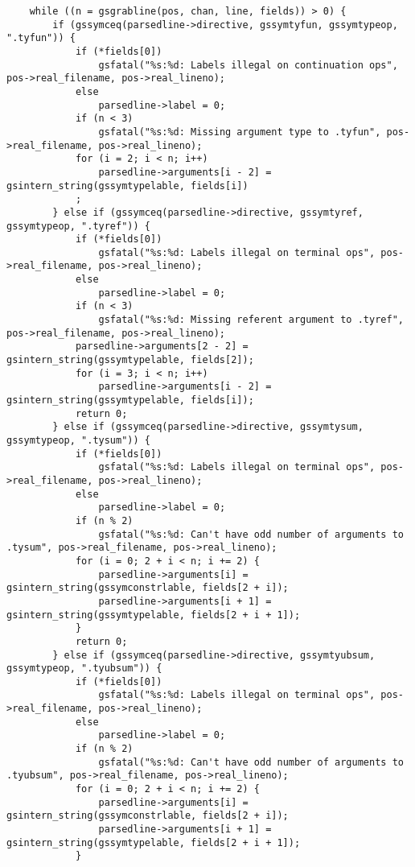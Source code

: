 \documentclass{report}
\begin{document}
\begin{verbatim}
    while ((n = gsgrabline(pos, chan, line, fields)) > 0) {
        if (gssymceq(parsedline->directive, gssymtyfun, gssymtypeop, ".tyfun")) {
            if (*fields[0])
                gsfatal("%s:%d: Labels illegal on continuation ops", pos->real_filename, pos->real_lineno);
            else
                parsedline->label = 0;
            if (n < 3)
                gsfatal("%s:%d: Missing argument type to .tyfun", pos->real_filename, pos->real_lineno);
            for (i = 2; i < n; i++)
                parsedline->arguments[i - 2] = gsintern_string(gssymtypelable, fields[i])
            ;
        } else if (gssymceq(parsedline->directive, gssymtyref, gssymtypeop, ".tyref")) {
            if (*fields[0])
                gsfatal("%s:%d: Labels illegal on terminal ops", pos->real_filename, pos->real_lineno);
            else
                parsedline->label = 0;
            if (n < 3)
                gsfatal("%s:%d: Missing referent argument to .tyref", pos->real_filename, pos->real_lineno);
            parsedline->arguments[2 - 2] = gsintern_string(gssymtypelable, fields[2]);
            for (i = 3; i < n; i++)
                parsedline->arguments[i - 2] = gsintern_string(gssymtypelable, fields[i]);
            return 0;
        } else if (gssymceq(parsedline->directive, gssymtysum, gssymtypeop, ".tysum")) {
            if (*fields[0])
                gsfatal("%s:%d: Labels illegal on terminal ops", pos->real_filename, pos->real_lineno);
            else
                parsedline->label = 0;
            if (n % 2)
                gsfatal("%s:%d: Can't have odd number of arguments to .tysum", pos->real_filename, pos->real_lineno);
            for (i = 0; 2 + i < n; i += 2) {
                parsedline->arguments[i] = gsintern_string(gssymconstrlable, fields[2 + i]);
                parsedline->arguments[i + 1] = gsintern_string(gssymtypelable, fields[2 + i + 1]);
            }
            return 0;
        } else if (gssymceq(parsedline->directive, gssymtyubsum, gssymtypeop, ".tyubsum")) {
            if (*fields[0])
                gsfatal("%s:%d: Labels illegal on terminal ops", pos->real_filename, pos->real_lineno);
            else
                parsedline->label = 0;
            if (n % 2)
                gsfatal("%s:%d: Can't have odd number of arguments to .tyubsum", pos->real_filename, pos->real_lineno);
            for (i = 0; 2 + i < n; i += 2) {
                parsedline->arguments[i] = gsintern_string(gssymconstrlable, fields[2 + i]);
                parsedline->arguments[i + 1] = gsintern_string(gssymtypelable, fields[2 + i + 1]);
            }

\end{verbatim}
\end{document}
